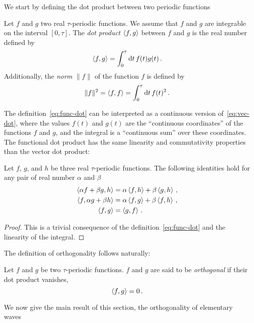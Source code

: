 We start by defining the dot product between two periodic functions
\begin{definition}
  Let $f$ and $g$ two real $\tau$-periodic functions. We assume that $f$ and $g$ are
  integrable on the interval $[0,\tau]$. The \emph{dot product} $\braket{f,g}$ between $f$
  and $g$ is the real number defined by
  \begin{equation}
    \braket{f,g}=\int_{0}^{\tau}\mathrm{d} t\, f(t)g(t)\,.\label{eq:func-dot}
  \end{equation}
  Additionally, the \emph{norm} $\|f\|$ of the function $f$ is defined by
  \begin{equation}
    \|f\|^2=\braket{f,f}=\int_{0}^{\tau}\mathrm{d} t\, f(t)^2\,.
  \end{equation}
\end{definition}
The definition~\cref{eq:func-dot} can be interpreted as a continuous version
of~\cref{eq:vec-dot}, where the values $f(t)$ and $g(t)$ are the ``continuous
coordinates'' of the functions $f$ and $g$, and the integral is a ``continuous sum'' over
these coordinates. The functional dot product has the same linearity and commutativity properties
than the vector dot product:
\begin{proposition}
  Let $f$, $g$, and $h$ be three real $\tau$-periodic functions. The following identities
  hold for any pair of real number $\alpha$ and $\beta$
  \begin{align}
    \braket{\alpha f+\beta g,h}&=\alpha\braket{f,h}+\beta\braket{g,h}\,,\\
    \braket{f,\alpha g+\beta h}&=\alpha\braket{f,g}+\beta\braket{f,h}\,,\\
    \braket{f,g}&=\braket{g,f}\,.
  \end{align}
\end{proposition}
\begin{proof}
  This is a trivial consequence of the definition~\cref{eq:func-dot} and the linearity of
  the integral.
\end{proof}
The definition of orthogonality follows naturally:
\begin{definition}
  \label{def:dot-rfunc}
  Let $f$ and $g$ be two $\tau$-periodic functions. $f$ and $g$ are said to be
  \emph{orthogonal} if their dot product vanishes, \ie
  \begin{equation}
    \braket{f,g}=0\,.
  \end{equation}
\end{definition}
We now give the main result of this section, \ie the orthogonality of elementary waves
